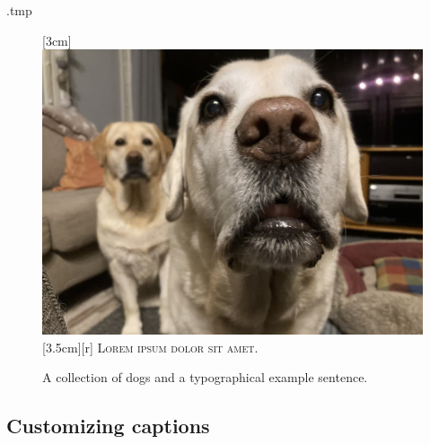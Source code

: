 \begin{VerbatimOut}{\jobname.tmp}
\begin{figure}
[3cm]{
  \includegraphics[bb=1cm 2cm 3cm 5cm, clip]
    {pictures/TheDogs.jpg}}
[3.5cm][r]{
  \scshape Lorem ipsum dolor sit amet.}

\caption{A collection of dogs and a typographical example sentence.}
\label{fig:subcaption}
\end{figure}
\end{VerbatimOut}
\ExecuteExample


%
%
\subsection{Customizing captions}


